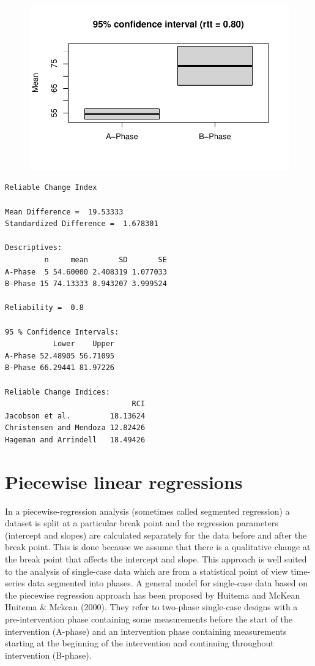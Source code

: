 \documentclass[
  letterpaper,
  DIV=11,
  numbers=noendperiod]{scrreprt}
\begin{document}
\begin{figure}[H]

{\centering \includegraphics{./ch_overlapping_indices_files/figure-pdf/unnamed-chunk-28-1.pdf}

}

\end{figure}

\begin{verbatim}
Reliable Change Index

Mean Difference =  19.53333 
Standardized Difference =  1.678301 

Descriptives:
         n     mean       SD       SE
A-Phase  5 54.60000 2.408319 1.077033
B-Phase 15 74.13333 8.943207 3.999524

Reliability =  0.8 

95 % Confidence Intervals:
           Lower    Upper
A-Phase 52.48905 56.71095
B-Phase 66.29441 81.97226

Reliable Change Indices:
                             RCI
Jacobson et al.         18.13624
Christensen and Mendoza 12.82426
Hageman and Arrindell   18.49426
\end{verbatim}

\hypertarget{sec-plm}{%
\chapter{Piecewise linear regressions}\label{sec-plm}}

In a piecewise-regression analysis (sometimes called segmented
regression) a dataset is split at a particular break point and the
regression parameters (intercept and slopes) are calculated separately
for the data before and after the break point. This is done because we
assume that there is a qualitative change at the break point that
affects the intercept and slope. This approach is well suited to the
analysis of single-case data which are from a statistical point of view
time-series data segmented into phases. A general model for single-case
data based on the piecewise regression approach has been proposed by
Huitema and McKean Huitema \& Mckean (2000). They refer to two-phase
single-case designs with a pre-intervention phase containing some
measurements before the start of the intervention (A-phase) and an
intervention phase containing measurements starting at the beginning of
the intervention and continuing throughout intervention (B-phase).
\end{document}
